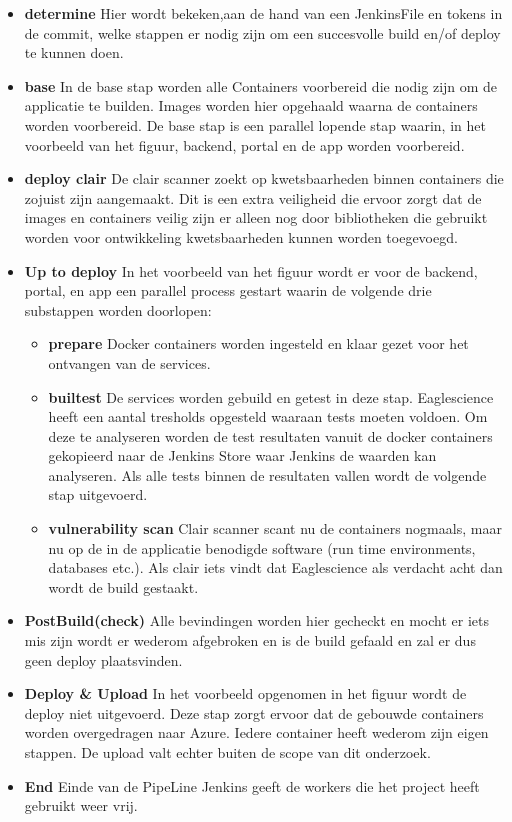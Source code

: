 \begin{itemize}
    \item \textbf{determine} Hier wordt bekeken,aan de hand van een JenkinsFile en tokens in de commit, welke stappen er nodig zijn om een succesvolle build en/of deploy te kunnen doen.
    \item \textbf{base} In de base stap worden alle Containers voorbereid die nodig zijn om de applicatie te builden. Images worden hier opgehaald waarna de containers worden voorbereid. De base stap is een parallel lopende stap waarin, in het voorbeeld van het figuur, backend, portal en de app worden voorbereid.
    \item \textbf{deploy clair} De clair scanner zoekt op kwetsbaarheden binnen containers die zojuist zijn aangemaakt. Dit is een extra veiligheid die ervoor zorgt dat de images en containers veilig zijn er alleen nog door bibliotheken die gebruikt worden voor ontwikkeling kwetsbaarheden kunnen worden toegevoegd.
    \item \textbf{Up to deploy}
    In het voorbeeld van het figuur wordt er voor de backend, portal, en app een parallel process gestart waarin de volgende drie substappen worden doorlopen:
    \begin{itemize}
        \item \textbf{prepare} Docker containers worden ingesteld en klaar gezet voor het ontvangen van de services.
        \item \textbf{builtest} De services worden gebuild en getest in deze stap. Eaglescience heeft een aantal tresholds opgesteld waaraan tests moeten voldoen. Om deze te analyseren worden de test resultaten vanuit de docker containers gekopieerd naar de Jenkins Store waar Jenkins de waarden kan analyseren. Als alle tests binnen de resultaten vallen wordt de volgende stap uitgevoerd.
        \item \textbf{vulnerability scan} Clair scanner scant nu de containers nogmaals, maar nu op de in de applicatie benodigde software (run time environments, databases etc.). Als clair iets vindt dat Eaglescience als verdacht acht dan wordt de build gestaakt.
    \end{itemize}
    \item \textbf{PostBuild(check)}
    Alle bevindingen worden hier gecheckt en mocht er iets mis zijn wordt er wederom afgebroken en is de build gefaald en zal er dus geen deploy plaatsvinden.
    \item \textbf{Deploy \& Upload}
    In het voorbeeld opgenomen in het figuur wordt de deploy niet uitgevoerd. Deze stap zorgt ervoor dat de gebouwde containers worden overgedragen naar Azure. Iedere container heeft wederom zijn eigen stappen. De upload valt echter buiten de scope van dit onderzoek.
    \item \textbf{End}
    Einde van de PipeLine Jenkins geeft de workers die het project heeft gebruikt weer vrij.
\end{itemize}


